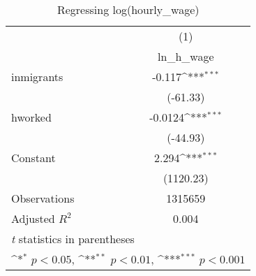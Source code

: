 \begin{table}[htbp]\centering
\def\sym#1{\ifmmode^{#1}\else\(^{#1}\)\fi}
\caption{Regressing log(hourly\_wage)}
\begin{tabular}{l*{1}{c}}
\hline\hline
                    &\multicolumn{1}{c}{(1)}\\
                    &\multicolumn{1}{c}{ln\_h\_wage}\\
\hline
inmigrants          &      -0.117\sym{***}\\
                    &    (-61.33)         \\
[1em]
hworked             &     -0.0124\sym{***}\\
                    &    (-44.93)         \\
[1em]
Constant            &       2.294\sym{***}\\
                    &   (1120.23)         \\
\hline
Observations        &     1315659         \\
Adjusted \(R^{2}\)  &       0.004         \\
\hline\hline
\multicolumn{2}{l}{\footnotesize \textit{t} statistics in parentheses}\\
\multicolumn{2}{l}{\footnotesize \sym{*} \(p<0.05\), \sym{**} \(p<0.01\), \sym{***} \(p<0.001\)}\\
\end{tabular}
\end{table}
